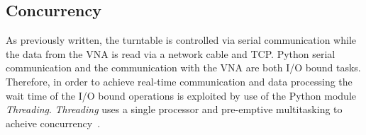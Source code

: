 \subsection{Concurrency}
As previously written, the turntable is controlled via serial communication while the data from the VNA is read via a network cable and TCP. Python serial communication and the communication with the VNA are both I/O bound tasks. Therefore, in order to achieve real-time communication and data processing the wait time of the I/O bound operations is exploited by use of the Python module \textit{Threading}. \textit{Threading} uses a single processor and pre-emptive multitasking to acheive concurrency~\cite{concurrency}. 

